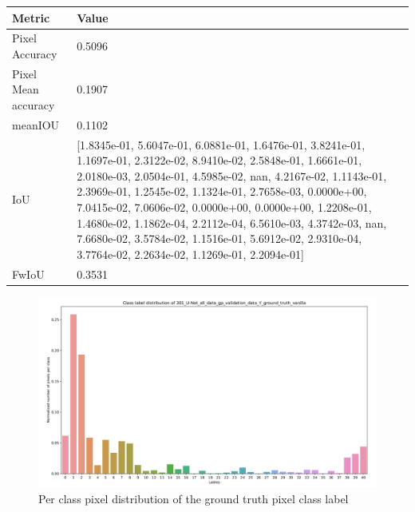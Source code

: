    \newpage 
    
    \begin{center}
    	\begin{tabular}{ | l | p{12cm} |}
    		\hline
    		
    		\cellcolor{purple!30}Metric & \cellcolor{purple!30}Value \\ \hline
    		Pixel Accuracy & 0.5096 \\ \hline
    		Pixel Mean accuracy & 0.1907  \\ \hline
    		meanIOU & 0.1102 \\ \hline
    		IoU & [1.8345e-01, 5.6047e-01, 6.0881e-01, 1.6476e-01, 3.8241e-01, 1.1697e-01, 
    		2.3122e-02, 8.9410e-02, 2.5848e-01, 1.6661e-01, 2.0180e-03, 2.0504e-01, 
    		4.5985e-02,        nan, 4.2167e-02, 1.1143e-01, 2.3969e-01, 1.2545e-02, 
    		1.1324e-01, 2.7658e-03, 0.0000e+00, 7.0415e-02, 7.0606e-02, 0.0000e+00,  
    		0.0000e+00, 1.2208e-01, 1.4680e-02, 1.1862e-04, 2.2112e-04, 6.5610e-03, 
    		4.3742e-03,        nan, 7.6680e-02, 3.5784e-02, 1.1516e-01, 5.6912e-02, 
    		2.9310e-04, 3.7764e-02, 2.2634e-02, 1.1269e-01, 2.2094e-01] \\ \hline
    		FwIoU & 0.3531 \\ \hline
    		\hline
    	\end{tabular}
    \end{center}
	
	\begin{figure}
		\centering
		\includegraphics[width=16cm]{images/Y_ground_truth_vanilla.png}
		\caption{Per class pixel distribution of the ground truth pixel class label}
		\label{fig:y_gt_vanilla}
	\end{figure}


